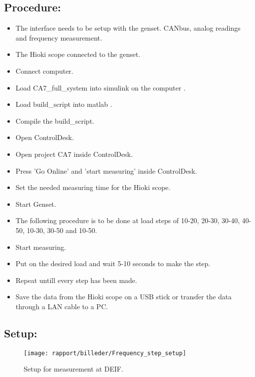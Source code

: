 \subsection*{Procedure:}

\begin{itemize}
	\item The interface needs to be setup with the genset. CANbus, analog readings and frequency measurement.  
	\item The Hioki scope connected to the genset.
	\item Connect computer.
	\item Load CA7\_full\_system into simulink on the computer .
	\item Load build\_script into matlab . 
	\item Compile the build\_script.
	\item Open ControlDesk.
	\item Open project CA7 inside ControlDesk.
	\item Press 'Go Online' and 'start measuring' inside ControlDesk. 
	\item Set the needed measuring time for the Hioki scope.  
	\item Start Genset.
	\item The following procedure is to be done at load steps of 10-20, 20-30, 30-40, 40-50, 10-30, 30-50 and 10-50.
	\item Start measuring. 
	\item Put on the desired load and wait 5-10 seconds to make the step.
	\item Repeat untill every step has been made. 
	\item Save the data from the Hioki scope on a USB stick or transfer the data through a LAN cable to a PC.  

\end{itemize}


\subsection*{Setup:}
\begin{figure}[H]
\centering
\texttt{[image: rapport/billeder/Frequency\_step\_setup]}
\caption{Setup for measurement at DEIF.}
\label{fig:Frequency_step_setup}
\end{figure} 



